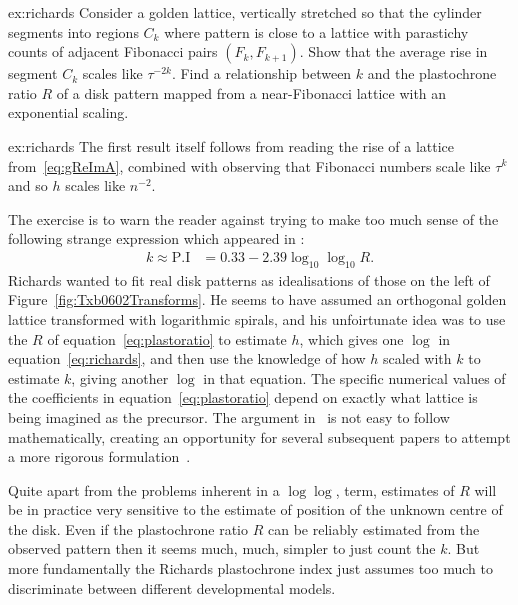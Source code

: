 \begin{jExercise}{ex:richards}
 Consider a golden lattice, vertically stretched so that the cylinder segments into regions $C_k$ where pattern is close to a lattice with parastichy counts of adjacent Fibonacci pairs $(F_k,F_{k+1})$.
	Show that the average rise in segment $C_k$ scales like $\tau^{-2k}$.
	Find a relationship between $k$ and the plastochrone ratio $R$ of a disk pattern mapped from a near-Fibonacci lattice with an exponential scaling.
\end{jExercise}
\begin{jAnswer}{ex:richards}
	The first result itself follows
	from reading the rise of a lattice from~\eqref{eq:gReImA}, combined with observing that Fibonacci numbers scale like $\tau^k$
	and so $h$ scales like $n^{-2}$. 
	
The exercise is to warn the reader against trying to make too much sense of the following strange expression which appeared in
	\autocite{richardsPhyllotaxisItsQuantitative1951}:
	\begin{align}
		k\approx \mbox{P.I} &= 0.33 - 2.39 \log_{10}  \log_{10} R.
		\label{eq:richards}
	\end{align}
	 Richards wanted to fit real disk patterns as idealisations of those on the left of Figure~\ref{fig:Txb0602Transforms}. He  
	 seems to have assumed an orthogonal golden lattice transformed with logarithmic spirals, and his unfoirtunate idea was to use the $R$ of equation~\eqref{eq:plastoratio} to estimate $h$, which gives one $\log$ in equation~\ref{eq:richards}, and then use the knowledge of how $h$ scaled with $k$ to estimate $k$, giving another $\log$ in that equation. The specific numerical values of the coefficients in equation~\eqref{eq:plastoratio} depend on exactly what lattice is being imagined as the precursor. The argument in~	\autocite{richardsPhyllotaxisItsQuantitative1951} is not easy to follow mathematically, creating an opportunity for several subsequent papers to attempt a more rigorous formulation~\autocite{thornleyPhyllotaxisIIDescription1975,jeanBib647,jeanBib278}.

Quite apart from the problems inherent in a $\log \log$, term, estimates of $R$ will be in practice very sensitive  to the estimate of position of the unknown centre of the disk. Even if the plastochrone ratio $R$ can be reliably estimated from the observed pattern then it seems much, much,  simpler to just count the $k$. But more fundamentally the Richards plastochrone index just assumes too much to discriminate between different developmental models.  

\end{jAnswer}
\clearpage

